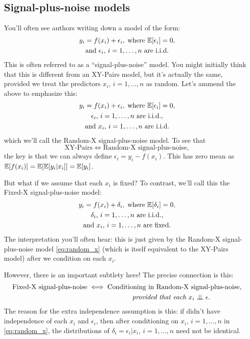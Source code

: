 \documentclass{article}
\begin{document}
\subsection{Signal-plus-noise models}

You'll often see authors writing down a model of the form:   
\begin{gather*}
y_i = f(x_i) + \epsilon_i, \; \text{where $\mathbb{E}[\epsilon_i] = 0$}, \\
\text{and $\epsilon_i$, $i=1,\dots,n$ are i.i.d.}  
\end{gather*}
This is often referred to as a ``signal-plus-noise'' model. You might initially
think that this is different from an XY-Pairs model, but it's actually the same,
provided we treat the predictors $x_i$, $i=1,\dots,n$ as random. Let's ammend 
the above to emphasize this:  
\begin{equation}
\begin{gathered}
\label{eq:random_x}
y_i = f(x_i) + \epsilon_i, \; \text{where $\mathbb{E}[\epsilon_i] = 0$}, \\
\text{$\epsilon_i$, $i=1,\dots,n$ are i.i.d.}, \\
\text{and $x_i$, $i=1,\dots,n$ are i.i.d.}  
\end{gathered}
\end{equation}
which we'll call the Random-X signal-plus-noise model. To see that
\[
\text{XY-Pairs} \iff \text{Random-X signal-plus-noise},
\]
the key is that we can always define $\epsilon_i = y_i - f(x_i)$. This has zero
mean as $\mathbb{E}[f(x_i)] = \mathbb{E}[\mathbb{E}[y_i|x_i]] = \mathbb{E}[y_i]$.   

But what if we assume that each $x_i$ is fixed? To contrast, we'll call this the
Fixed-X signal-plus-noise model: 
\begin{equation}
\begin{gathered}
\label{eq:fixed_x}
y_i = f(x_i) + \delta_i, \; \text{where $\mathbb{E}[\delta_i] = 0$}, \\
\text{$\delta_i$, $i=1,\dots,n$ are i.i.d.}, \\  
\text{and $x_i$, $i=1,\dots,n$ are fixed.}   
\end{gathered}
\end{equation}
The interpretation you'll often hear: this is just given by the Random-X 
signal-plus-noise model \eqref{eq:random_x} (which is itself equivalent to the
XY-Pairs model) after we condition on each $x_i$.          

However, there is an important subtlety here! The precise connection is this: 
\begin{gather*}
\text{Fixed-X signal-plus-noise} \iff \text{Conditioning in Random-X
  signal-plus-noise}, \\  
\hspace{130pt} \text{\emph{provided that each $x_i \indep \epsilon$}}.  
\end{gather*}
The reason for the extra independence assumption is this: if didn't have
independence of each $x_i$ and $\epsilon_i$, then after conditioning on $x_i$,
$i=1,\dots,n$ in \eqref{eq:random_x}, the distributions of $\delta_i =
\epsilon_i | x_i$, $i=1,\dots,n$ need not be identical.  
\end{document}
